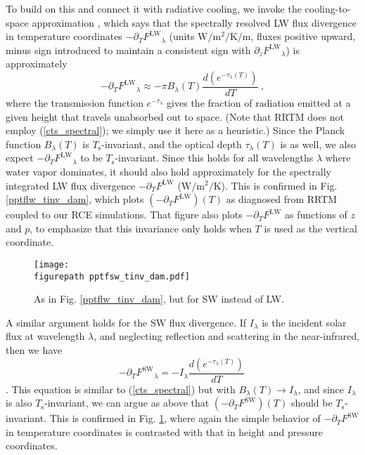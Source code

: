 \documentclass[9pt,twocolumn,twoside,lineno]{pnas-new}
\newcommand{\beqn}{\begin{equation}}
\newcommand{\eeqn}{\end{equation}}
\newcommand{\eqnref}[1]{(\ref{#1})}
\newcommand{\der}[2]{\ensuremath{\frac{d #1}{d #2}}}
\newcommand{\ppz}{\ensuremath{\partial_z}}
\newcommand{\ppt}{\ensuremath{\partial_T}}
\newcommand{\FLW}{\ensuremath{F^\mathrm{LW}}}
\newcommand{\FSW}{\ensuremath{F^\mathrm{SW}}}
\newcommand{\tauk}{\ensuremath{\tau_\lambda}}
\newcommand{\Wmsq}{\ensuremath{\mathrm{W/m^2}}}
\newcommand{\meter}{\ensuremath{\mathrm{m}}}
\newcommand{\Ts}{\ensuremath{T_\mathrm{s}}}
\newcommand{\figurepath}{./}
\begin{document}
	To build on this and connect it with radiative cooling, we invoke the cooling-to-space  approximation \cite[][]{thomas2002, rodgers1966}, which says that the spectrally resolved LW flux divergence in temperature coordinates $-\ppt \FLW_\lambda$ (units $\Wmsq/\mathrm{K}/\meter$, fluxes positive upward, minus sign introduced to maintain a consistent sign with  $\ppz \FLW_\lambda$) is approximately
	\beqn
		-\ppt \FLW_\lambda \approx - \pi B_\lambda(T) \frac{d (e^{-\tauk(T)})}{dT} \ ,
	\label{cts_spectral}
	\eeqn
where  the transmission function $e^{-\tauk}$ gives the fraction of radiation emitted at a given height that travels unabsorbed out to space. (Note that RRTM does not employ \eqnref{cts_spectral}; we simply use it here as a heuristic.) Since the Planck function $B_\lambda(T)$ is \Ts-invariant, and the optical depth $\tauk(T)$ is as well, we also expect $-\ppt \FLW_\lambda$ to be \Ts-invariant. Since this holds for all wavelengths $\lambda$ where water vapor dominates, it should also hold approximately for the spectrally integrated LW flux divergence $-\ppt \FLW$ ($\Wmsq/\mathrm{K}$). This is confirmed in  Fig.  \ref{pptflw_tinv_dam}, which plots $(-\ppt \FLW)(T)$ as diagnosed from RRTM coupled to our  RCE simulations.  That figure also plots $-\ppt \FLW$ as functions of $z$ and $p$, to emphasize that this invariance only holds  when $T$ is used as the vertical coordinate.
\begin{figure}[t]
	\begin{center}
			\texttt{[image: \\figurepath pptfsw\_tinv\_dam.pdf]}
		\caption{As in Fig. \ref{pptflw_tinv_dam}, but for SW instead of LW.
		\label{pptfsw_tinv_dam}
		}
	\end{center}
\end{figure}


	A similar argument holds for the SW flux divergence. If $I_\lambda$ is the incident solar flux at wavelength $\lambda$, and  neglecting reflection and scattering in the  near-infrared, 
then  we have
	\beqn
		-\ppt \FSW_\lambda = - I_\lambda \der{(e^{-\tauk(T)})}{T}
		\
	\eeqn
\cite[][eqn. 9.26]{thomas2002}. This equation is similar to  \eqnref{cts_spectral} but with $B_\lambda(T) \rightarrow I_\lambda$, and since $I_\lambda$ is also \Ts-invariant, we can argue as above that $(-\ppt \FSW)(T)$ should be \Ts-invariant. This is confirmed in Fig. \ref{pptfsw_tinv_dam}, where again the simple behavior of $-\ppt \FSW$ in temperature coordinates is contrasted with that in height and pressure coordinates.
\end{document}
